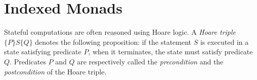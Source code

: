 \newcommand{\framedhslinecorrect}[2]%
  {#1[#2]}

\newcommand{\framedhs}{\sethscode{framedhscode}}


\newenvironment{inlinehscode}%
  {\(\def\column##1##2{}%
   \let\>\undefined\let\<\undefined\let\\\undefined
   \newcommand\>[1][]{}\newcommand\<[1][]{}\newcommand\\[1][]{}%
   \def\fromto##1##2##3{##3}%
   \def\nextline{}}{\) }%

\newcommand{\inlinehs}{\sethscode{inlinehscode}}


\newenvironment{joincode}%
  {\let\orighscode=\hscode
   \let\origendhscode=\endhscode
   \def\endhscode{\def\hscode{\endgroup\def\@currenvir{hscode}\\}\begingroup}
   \orighscode\def\hscode{\endgroup\def\@currenvir{hscode}}}%
  {\origendhscode
   \global\let\hscode=\orighscode
   \global\let\endhscode=\origendhscode}%

\makeatother
\EndFmtInput
%

%
\makeatletter

\let\Varid\mathit
\let\Conid\mathsf

\def\commentbegin{\quad\{\ }
\def\commentend{\}}

\newcommand{\ty}[1]{\Conid{#1}}
\newcommand{\con}[1]{\Conid{#1}}
\newcommand{\id}[1]{\Varid{#1}}
\newcommand{\cl}[1]{\Varid{#1}}
\newcommand{\opsym}[1]{\mathrel{#1}}

\newcommand\Keyword[1]{\textbf{\textsf{#1}}}
\newcommand\Hide{\mathbin{\downarrow}}
\newcommand\Reveal{\mathbin{\uparrow}}




\makeatother
\EndFmtInput

\section{Indexed Monads}
\label{sec:indexed-monads}

Stateful computations are often reasoned using Hoare logic. A {\em Hoare triple}
$\{P\} S \{Q\}$ denotes the following proposition: if the statement $S$ is
executed in a state satisfying predicate $P$, when it terminates, the state must
satisfy predicate $Q$. Predicates $P$ and $Q$ are respectively called the
\emph{precondition} and the \emph{postcondition} of the Hoare triple.

